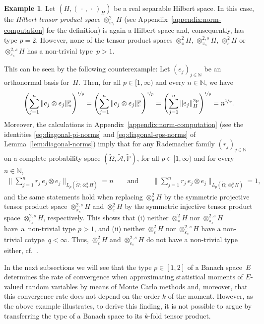 \documentclass[reqno]{amsart}
\numberwithin{equation}{section}
\newcommand{\bbN}{\mathbb{N}}
\newcommand{\bbP}{\mathbb{P}}
\newcommand{\cA}{\mathcal{A}}
\newcommand{\Omegat}{\widetilde{\Omega}}
\newcommand{\cAt}{\widetilde{\cA}}
\newcommand{\bbPt}{\widetilde{\bbP}}
\newcommand{\norm}[2]{     \| #1       \|_{ #2 }}
\newcommand{\scalar}[2]{     ( #1       )_{ #2 }}
\newcommand{\eps}{\varepsilon}
\theoremstyle{remark}
\theoremstyle{definition}
\newtheorem{example}[lemma]{Example}
\begin{document}
\begin{example}\label{example:type-tensor}  
	Let $(H, \scalar{\,\cdot\,, \,\cdot\,}{H})$ 
	be a real separable Hilbert space. 
	In this case, 
	the \emph{Hilbert tensor product space} $\otimes_{w_2}^2 H$ 
	(see Appendix~\ref{appendix:norm-computation} for the definition) 
	is again a Hilbert space 
	and, consequently, 
	has type $p=2$. 
	However, 
	none of the tensor product spaces 
	$\otimes_\pi^2 H$, $\otimes^{2,s}_{\pi_s}H$, 
	$\otimes_\eps^2 H$ or $\otimes^{2,s}_{\eps_s}H$ 
	has a non-trivial type~${p>1}$. 
	
	This can be seen by the following counterexample: 
	Let $(e_j)_{j\in\bbN}$ be an orthonormal basis for~$H$. 
	Then, for all $p\in[1,\infty)$ and every $n\in\bbN$, we have 
	\[
	\Biggl( 
	\sum_{j=1}^n \norm{e_j\otimes e_j}{\pi}^p 
	\Biggr)^{\nicefrac{1}{p}} 
	=
	\Biggl( 
	\sum_{j=1}^n \norm{e_j\otimes e_j}{\eps}^p 
	\Biggr)^{\nicefrac{1}{p}} 
	= 
	\Biggl( 
	\sum_{j=1}^n \norm{e_j}{H}^{2p}  
	\Biggr)^{\nicefrac{1}{p}} 
	=
	n^{\nicefrac{1}{p}} . 
	\]
	Moreover, the
	calculations in Appendix~\ref{appendix:norm-computation} 
	(see the identities \eqref{eq:diagonal-pi-norms} 
	and \eqref{eq:diagonal-eps-norms} 
	of Lemma~\ref{lem:diagonal-norms})
	imply that 
	for any Rademacher family $(r_j)_{j\in\bbN}$ 
	on a complete probability space 
	$(\Omegat,\cAt,\bbPt)$, 
	for all $p\in[1,\infty)$ 
	and 
	for every $n\in\bbN$,  
	\begin{align*} 
	\biggl\| 
	\sum_{j=1}^n r_j \, e_j \otimes e_j  
	\biggr\|_{L_p(\Omegat; \otimes^2_\pi H)}  
	=
	n 
	\qquad 
	\text{and} 
	\qquad   
	\biggl\| 
	\sum_{j=1}^n r_j \, e_j \otimes e_j  
	\biggr\|_{L_p(\Omegat; \otimes^2_\eps H)}  
	=
	1, 
	\end{align*} 
	and the same statements hold when 
	replacing $\otimes^2_\pi H$ by the symmetric projective tensor product 
	space $\otimes^{2,s}_{\pi_s} H$ 
	and 
	$\otimes^2_\eps H$ by the symmetric injective tensor product 
	space $\otimes^{2,s}_{\eps_s} H$, respectively. 
	This shows that (i) neither 
	$\otimes^2_\pi H$ nor $\otimes^{2,s}_{\pi_s} H$
	have~a~non-trivial type $p>1$, 
	and (ii) neither  
	$\otimes^2_\eps H$ nor $\otimes^{2,s}_{\eps_s} H$ 
	have a
	non-trivial cotype~$q<\infty$. 
	Thus, 
	$\otimes^2_\eps H$ and $\otimes^{2,s}_{\eps_s} H$ 
	do not have a non-trivial type either, 
	cf.~\cite[Theorem~7.1.14]{AnalysisInBanachSpacesII2017}. 
\end{example} 

In the next subsections we will see 
that the type $p\in[1,2]$ of a Banach space~$E$
determines the rate of convergence 
when approximating statistical moments 
of $E$-valued random variables 
by means of Monte Carlo methods  
and, moreover, that this convergence rate 
does not depend on the order $k$ of the moment. 
However, as the above example illustrates, 
to derive this finding, 
it is not possible to argue 
by transferring the type of 
a Banach space to its $k$-fold tensor product. 
\end{document}
